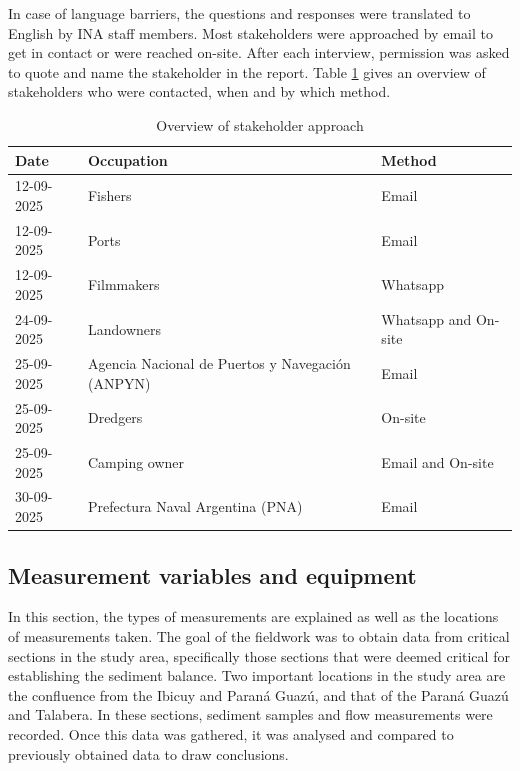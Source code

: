 In case of language barriers, the questions and responses were translated to English by INA staff members. Most stakeholders were approached by email to get in contact or were reached on-site. After each interview, permission was asked to quote and name the stakeholder in the report. Table \ref{tab:stakeholders} gives an overview of stakeholders who were contacted, when and by which method. 

\begin{table}[H]
    \centering
    \caption{Overview of stakeholder approach}
    \begin{tabularx}{\textwidth}{l l l}
        \toprule
        Date & Occupation & Method \\
        \midrule
        12-09-2025 & Fishers & Email \\
        12-09-2025 & Ports & Email \\
        12-09-2025 & Filmmakers & Whatsapp \\
        24-09-2025 & Landowners & Whatsapp and On-site \\
        25-09-2025 & Agencia Nacional de Puertos y Navegación (ANPYN) &  Email \\
        25-09-2025 & Dredgers & On-site \\
        25-09-2025 & Camping owner & Email and On-site \\
        30-09-2025 & Prefectura Naval Argentina (PNA) & Email \\
        \bottomrule
    \end{tabularx}
    
    \label{tab:stakeholders}
\end{table}


\subsection{Measurement variables and equipment}
\label{Measurement variables and equipment}
In this section, the types of measurements are explained as well as the locations of measurements taken. The goal of the fieldwork was to obtain data from critical sections in the study area, specifically those sections that were deemed critical for establishing the sediment balance. Two important locations in the study area are the confluence from the Ibicuy and Paraná Guazú, and that of the Paraná Guazú and Talabera. In these sections, sediment samples and flow measurements were recorded. Once this data was gathered, it was analysed and compared to previously obtained data to draw conclusions. 

